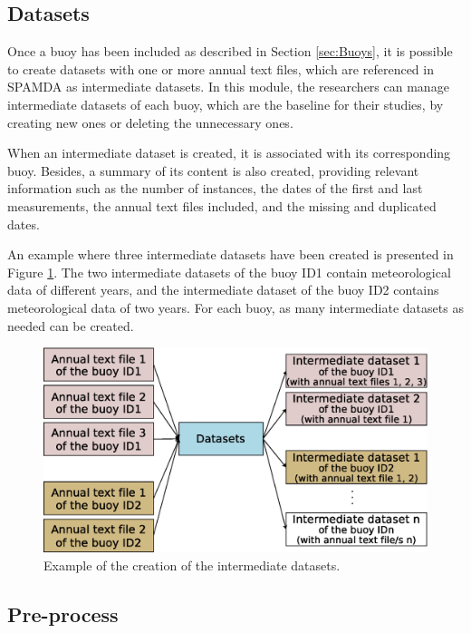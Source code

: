 \documentclass[energies,article,submit,moreauthors,pdftex]{Definitions/mdpi}
\begin{document}
			\subsection{Datasets}\label{sec:Datasets}
			
				Once a buoy has been included as described in Section \ref{sec:Buoys}, it is possible to create datasets with one or more annual text files, which are referenced in SPAMDA as intermediate datasets. In this module, the researchers can manage intermediate datasets of each buoy, which are the baseline for their studies, by creating new ones or deleting the unnecessary ones.
				
				When an intermediate dataset is created, it is associated with its corresponding buoy. Besides, a summary of its content is also created, providing relevant information such as the number of instances, the dates of the first and last measurements, the annual text files included, and the missing and duplicated dates.
				
				An example where three intermediate datasets have been created is presented in Figure \ref{fig:datasets}. The two intermediate datasets of the buoy ID1 contain meteorological data of different years, and the intermediate dataset of the buoy ID2 contains meteorological data of two years. For each buoy, as many intermediate datasets as needed can be created.
				
				\begin{figure}[H]
					\centering
					\includegraphics[scale=0.40]{figures/FigureDatasets.eps}
					\caption{Example of the creation of the intermediate datasets.}
					\label{fig:datasets}
				\end{figure}
				
				
			\subsection{Pre-process} \label{sec:Preprocess}
				
\end{document}
